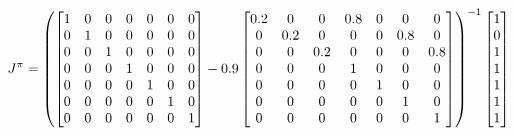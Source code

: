 \documentclass{article}
\begin{document}
\begin{equation}
    \notag
    J^\pi = \left(
    \begin{bmatrix}
        1 & 0 & 0 & 0 & 0 & 0 & 0 \\
        0 & 1 & 0 & 0 & 0 & 0 & 0 \\
        0 & 0 & 1 & 0 & 0 & 0 & 0 \\
        0 & 0 & 0 & 1 & 0 & 0 & 0 \\
        0 & 0 & 0 & 0 & 1 & 0 & 0 \\
        0 & 0 & 0 & 0 & 0 & 1 & 0 \\
        0 & 0 & 0 & 0 & 0 & 0 & 1 \\
    \end{bmatrix} - 0.9
    \begin{bmatrix}
        0.2 & 0 & 0 & 0.8 & 0 & 0 & 0 \\
        0 & 0.2 & 0 & 0 & 0 & 0.8 & 0 \\
        0 & 0 & 0.2 & 0 & 0 & 0 & 0.8 \\
        0 & 0 & 0 & 1 & 0 & 0 & 0 \\
        0 & 0 & 0 & 0 & 1 & 0 & 0 \\
        0 & 0 & 0 & 0 & 0 & 1 & 0 \\
        0 & 0 & 0 & 0 & 0 & 0 & 1 \\
    \end{bmatrix}\right)^{-1}
    \begin{bmatrix}
        1 \\
        0 \\
        1 \\
        1 \\
        1 \\
        1 \\
        1 \\
    \end{bmatrix}
\end{equation}
\end{document}
